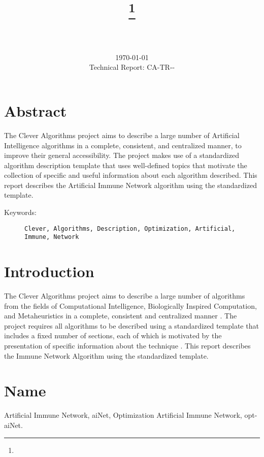 \documentclass[a4paper, 11pt]{article}
\title{{\myreporttitle}\footnote{\myreportlicense}}
\author{\myreportauthor\\{\myreportemail}\\\small\myreportproject}
\date{\today\\{\small{Technical Report: CA-TR-{\myreportdate}-\myreportversion}}}
\begin{document}
\maketitle

\section*{Abstract} 
The Clever Algorithms project aims to describe a large number of Artificial Intelligence algorithms in a complete, consistent, and centralized manner, to improve their general accessibility. 
The project makes use of a standardized algorithm description template that uses well-defined topics that motivate the collection of specific and useful information about each algorithm described.
This report describes the Artificial Immune Network algorithm using the standardized template.

\begin{description}
	\item[Keywords:] {\small\texttt{Clever, Algorithms, Description, Optimization, Artificial, Immune, Network}}
\end{description} 

\section{Introduction} 
\label{sec:intro}
The Clever Algorithms project aims to describe a large number of algorithms from the fields of Computational Intelligence, Biologically Inspired Computation, and Metaheuristics in a complete, consistent and centralized manner \cite{Brownlee2010}.
The project requires all algorithms to be described using a standardized template that includes a fixed number of sections, each of which is motivated by the presentation of specific information about the technique \cite{Brownlee2010a}.
This report describes the Immune Network Algorithm using the standardized template.

\section{Name} 
\label{sec:name}
Artificial Immune Network, aiNet, Optimization Artificial Immune Network, opt-aiNet.
\end{document}
